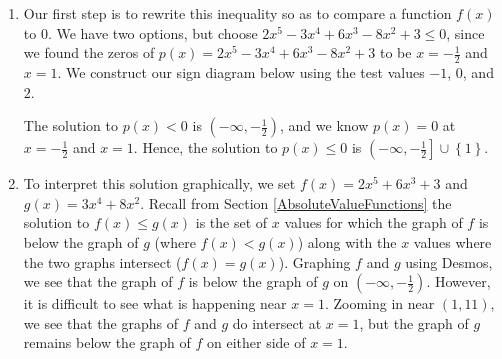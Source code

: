 \documentclass{ximera}
\begin{document}
\begin{example}
\begin{enumerate}
The quotient polynomial is $2x^2 + 6$ which has no real zeros so we get $x=-\frac{1}{2}$ and $x=1$.   

\item Our first step is to rewrite this inequality so as to compare a function $f(x)$ to $0$.  We have two options, but choose $2x^5-3x^4+6x^3-8x^2+3 \leq 0$, since  we found the zeros of $p(x) = 2x^5-3x^4+6x^3-8x^2+3$ to be $x=-\frac{1}{2}$ and $x=1$. We construct our sign diagram below using the test values $-1$, $0$, and $2$.

\begin{center}
\begin{image}
\end{image}
\end{center}

The solution to $p(x) < 0$ is $\left(-\infty, -\frac{1}{2}\right)$, and we know $p(x) = 0$ at $x=-\frac{1}{2}$ and $x=1$.  Hence, the solution to $p(x) \leq 0$ is $\left(-\infty, -\frac{1}{2}\right] \cup \left\{1\right\}$.  


\item To interpret this solution graphically, we set $f(x) = 2x^5+6x^3+3$ and $g(x) = 3x^4+8x^2$.  Recall from Section \ref{AbsoluteValueFunctions} the solution to $f(x) \leq g(x)$ is the set of $x$ values for which the graph of $f$ is below the graph of $g$ (where $f(x) < g(x)$) along with the $x$ values where the two graphs intersect ($f(x) = g(x)$).  Graphing $f$ and $g$ using Desmos, we see that the graph of $f$ is below the graph of $g$ on $\left(-\infty, -\frac{1}{2}\right)$. However, it is difficult to see what is happening near $x=1$.  Zooming in near $(1,11)$, we see that the graphs of $f$ and $g$ do intersect at $x=1$, but the graph of $g$ remains below the graph of $f$ on either side of $x = 1$.


\end{enumerate}
\end{example}
\end{document}
